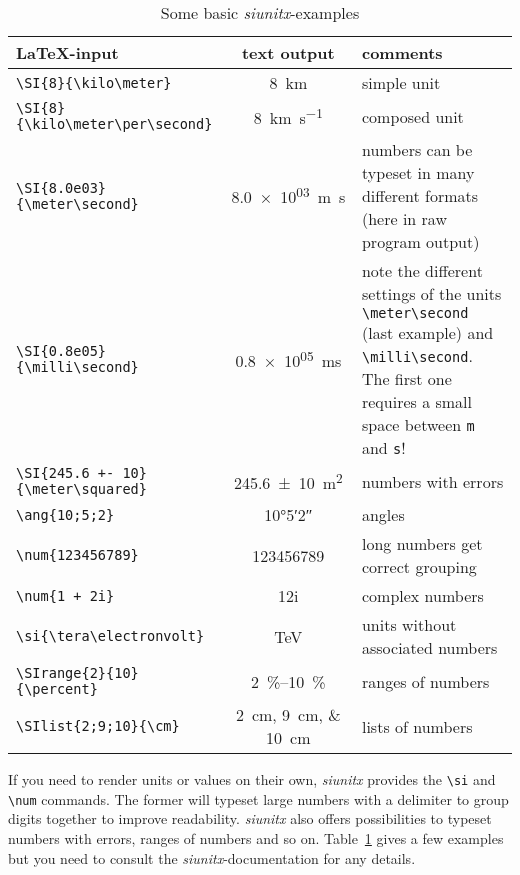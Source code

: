\documentclass[12pt, a4paper]{scrartcl}
\newcommand{\siunitx}{\textit{siunitx}\xspace}
\begin{document}
\begin{table}[ht]
  \caption{Some basic \siunitx-examples}
  \label{tab:numb_units}
  \centering
  \begin{tabular}{lcp{4cm}}
    \toprule
    \textbf{\LaTeX-input} & \textbf{text output} & \textbf{comments} \\
    \midrule
    \verb|\SI{8}{\kilo\meter}| & \SI{8}{\kilo\meter} & simple unit \\
    \verb|\SI{8}{\kilo\meter\per\second}| &
      \SI{8}{\kilo\meter\per\second} & composed unit \\
    \verb|\SI{8.0e03}{\meter\second}| &
      \SI{8.0e03}{\meter\second} & numbers can be typeset in many
      different formats (here in raw program output) \\
    \verb|\SI{0.8e05}{\milli\second}| &
      \SI{0.8e05}{\milli\second} & note the different settings of the
      units \verb|\meter\second| (last example) and
      \verb|\milli\second|. The first one requires a small space
      between \texttt{m} and \texttt{s}!\\
    \verb|\SI{245.6 +- 10}{\meter\squared}| &
      \SI{245.6 +- 10}{\meter\squared} & numbers with errors \\
    \midrule
    \verb|\ang{10;5;2}| & \ang{10;5;2} & angles \\
    \verb|\num{123456789}| &
      \num{123456789} & long numbers get correct grouping  \\
    \verb|\num{1 + 2i}| &
      \num{1+2i} & complex numbers \\
    \midrule
    \verb|\si{\tera\electronvolt}| &
      \si{\tera\electronvolt} & units without associated numbers  \\
    \midrule
    \verb|\SIrange{2}{10}{\percent}| &
      \SIrange{2}{10}{\percent}  & ranges of numbers  \\
    \midrule
    \verb|\SIlist{2;9;10}{\cm}| &
        \SIlist{2;9;10}{\cm} & lists of numbers  \\
    \bottomrule
  \end{tabular}
\end{table}

If you need to render units or values on their own, \siunitx provides
the \verb|\si| and \verb|\num| commands. The former will typeset large
numbers with a delimiter to group digits together to improve
readability. \siunitx also offers possibilities to typeset numbers
with errors, ranges of numbers and so on. Table~\ref{tab:numb_units}
gives a few examples but you need to consult the
\siunitx-documentation for any details.
\end{document}
